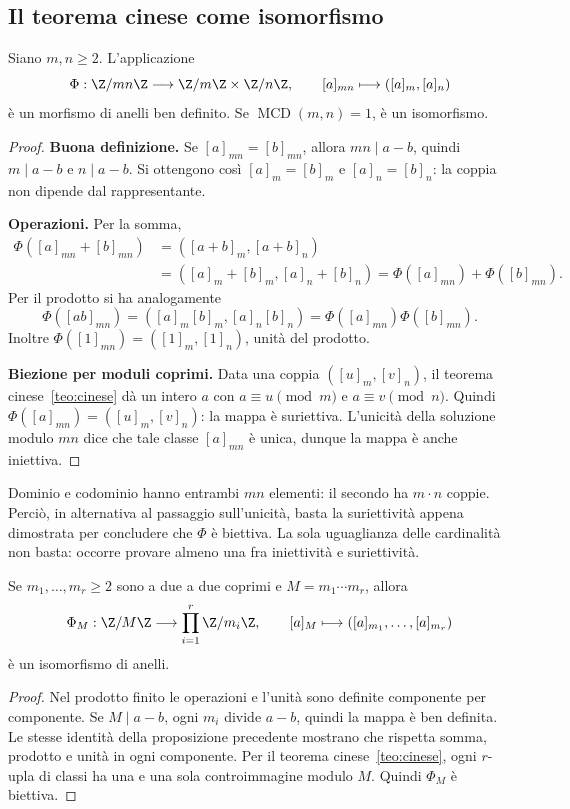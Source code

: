 \subsection{Il teorema cinese come isomorfismo}
\begin{proposizione}\label{prop:crt-morfismo}
Siano $m,n\ge2$. L'applicazione
\[
\Phi:\Z/mn\Z\longrightarrow\Z/m\Z\times\Z/n\Z,
\qquad [a]_{mn}\longmapsto([a]_m,[a]_n)
\]
è un morfismo di anelli ben definito. Se $\operatorname{MCD}(m,n)=1$, è un isomorfismo.
\end{proposizione}
\begin{proof}
\textbf{Buona definizione.} Se $[a]_{mn}=[b]_{mn}$, allora $mn\mid a-b$, quindi $m\mid a-b$ e $n\mid a-b$. Si ottengono così $[a]_m=[b]_m$ e $[a]_n=[b]_n$: la coppia non dipende dal rappresentante.

\textbf{Operazioni.} Per la somma,
\[
\begin{aligned}
\Phi([a]_{mn}+[b]_{mn})
 &=([a+b]_m,[a+b]_n)\\
 &=([a]_m+[b]_m,[a]_n+[b]_n)
 =\Phi([a]_{mn})+\Phi([b]_{mn}).
\end{aligned}
\]
Per il prodotto si ha analogamente
\[
\Phi([ab]_{mn})=([a]_m[b]_m,[a]_n[b]_n)
              =\Phi([a]_{mn})\Phi([b]_{mn}).
\]
Inoltre $\Phi([1]_{mn})=([1]_m,[1]_n)$, unità del prodotto.

\textbf{Biezione per moduli coprimi.} Data una coppia $([u]_m,[v]_n)$, il teorema cinese~\ref{teo:cinese} dà un intero $a$ con $a\equiv u\pmod m$ e $a\equiv v\pmod n$. Quindi $\Phi([a]_{mn})=([u]_m,[v]_n)$: la mappa è suriettiva. L'unicità della soluzione modulo $mn$ dice che tale classe $[a]_{mn}$ è unica, dunque la mappa è anche iniettiva.
\end{proof}

\begin{osservazione}
Dominio e codominio hanno entrambi $mn$ elementi: il secondo ha $m\cdot n$ coppie. Perciò, in alternativa al passaggio sull'unicità, basta la suriettività appena dimostrata per concludere che $\Phi$ è biettiva. La sola uguaglianza delle cardinalità non basta: occorre provare almeno una fra iniettività e suriettività.
\end{osservazione}

\begin{corollario}\label{cor:crt-anelli}
Se $m_1,\ldots,m_r\ge2$ sono a due a due coprimi e $M=m_1\cdots m_r$, allora
\[
\Phi_M:\Z/M\Z\longrightarrow\prod_{i=1}^r\Z/m_i\Z,
\qquad [a]_M\longmapsto([a]_{m_1},\ldots,[a]_{m_r})
\]
è un isomorfismo di anelli.
\end{corollario}
\begin{proof}
Nel prodotto finito le operazioni e l'unità sono definite componente per componente. Se $M\mid a-b$, ogni $m_i$ divide $a-b$, quindi la mappa è ben definita. Le stesse identità della proposizione precedente mostrano che rispetta somma, prodotto e unità in ogni componente. Per il teorema cinese~\ref{teo:cinese}, ogni $r$-upla di classi ha una e una sola controimmagine modulo $M$. Quindi $\Phi_M$ è biettiva.
\end{proof}


